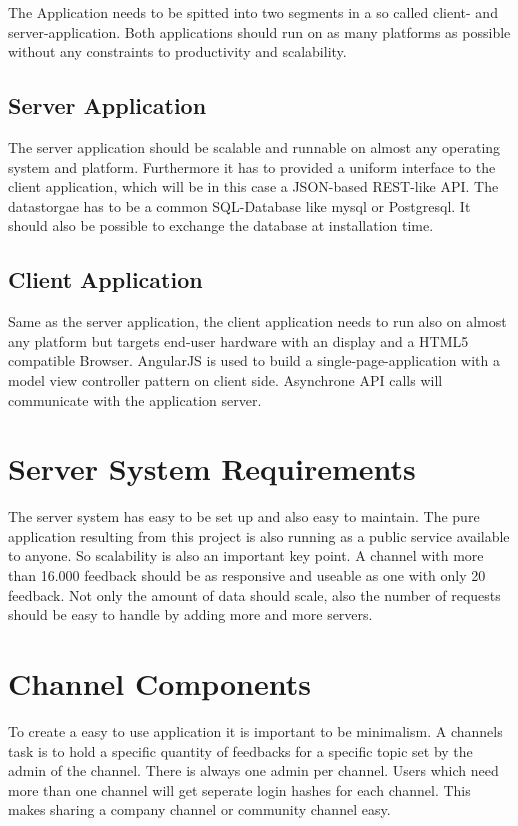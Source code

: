 The Application needs to be spitted into two segments in a so called client- and server-application. Both applications should run on as many platforms as possible without any constraints to productivity and scalability. 

\subsection{Server Application}
The server application should be scalable and runnable on almost any operating system and platform. Furthermore it has to provided a uniform interface to the client application, which will be in this case a JSON-based REST-like API. The datastorgae has to be a common SQL-Database like mysql or Postgresql. It should also be possible to exchange the database at installation time. 

\subsection{Client Application}
Same as the server application, the client application needs to run also on almost any platform but targets end-user hardware with an display and a HTML5 compatible Browser. AngularJS is used to build a single-page-application with a model view controller pattern on client side. Asynchrone API calls will communicate with the application server. 

\section{Server System Requirements}
The server system has easy to be set up and also easy to maintain. The pure application resulting from this project is also running as a public service available to anyone. So scalability is also an important key point. A channel with more than 16.000 feedback should be as responsive and useable as one with only 20 feedback. 
Not only the amount of data should scale, also the number of requests should be easy to handle by adding more and more servers. 

\section{Channel Components}
To create a easy to use application it is important to be minimalism.  A channels task is to hold a specific quantity of feedbacks for a specific topic set by the admin of the channel. There is always one admin per channel. Users which need more than one channel will get seperate login hashes for each channel. This makes sharing a company channel or community channel easy. 

